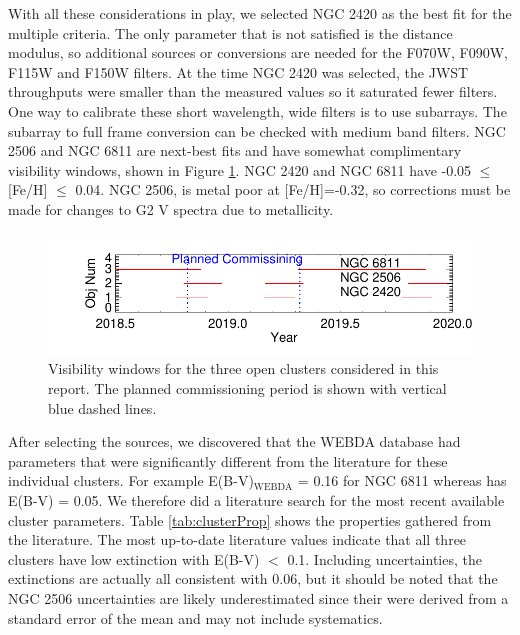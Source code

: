 \documentclass{aastex6}
\begin{document}
With all these considerations in play, we selected NGC 2420 as the best fit for the multiple criteria.
The only parameter that is not satisfied is the distance modulus, so additional sources or conversions are needed for the F070W, F090W, F115W and F150W filters.
At the time NGC 2420 was selected, the JWST throughputs were smaller than the measured values so it saturated fewer filters.
One way to calibrate these short wavelength, wide filters is to use subarrays.
The subarray to full frame conversion can be checked with medium band filters.
NGC 2506 and NGC 6811 are next-best fits and have somewhat complimentary visibility windows, shown in Figure \ref{fig:clusterVis}. NGC 2420 and NGC 6811 have -0.05 $\le$ [Fe/H] $\le$ 0.04.
NGC 2506, is metal poor at [Fe/H]=-0.32, so corrections must be made for changes to G2 V spectra due to metallicity.

\begin{figure}
\centering
\includegraphics[width=.4\columnwidth]{cluster_visibilty.pdf}
\caption{Visibility windows for the three open clusters considered in this report.
The planned commissioning period is shown with vertical blue dashed lines.}\label{fig:clusterVis}
\end{figure}

After selecting the sources, we discovered that the WEBDA database had parameters that were significantly different from the literature for these individual clusters.
For example E(B-V)$_\mathrm{WEBDA}$ = 0.16 for NGC 6811 whereas \citet{molendaz2016spec6811} has E(B-V) = 0.05.
We therefore did a literature search for the most recent available cluster parameters.
Table \ref{tab:clusterProp} shows the properties gathered from the literature.
The most up-to-date literature values indicate that all three clusters have low extinction with E(B-V) $<$ 0.1.
Including uncertainties, the extinctions are actually all consistent with 0.06, but it should be noted that the NGC 2506 uncertainties are likely underestimated since their were derived from a standard error of the mean and may not include systematics.
\end{document}
